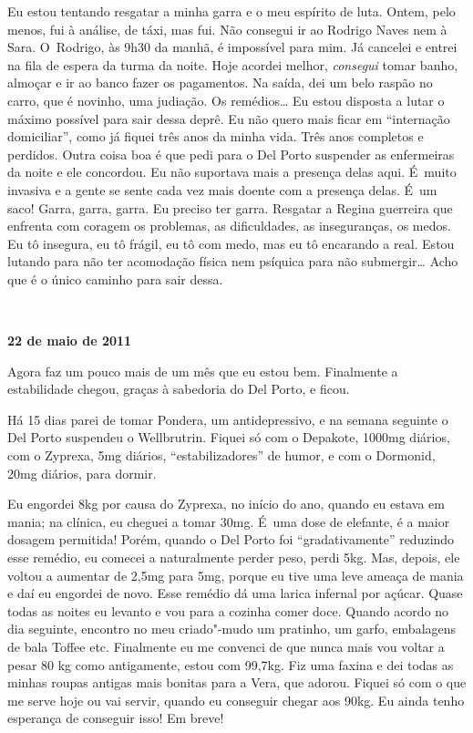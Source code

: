 Eu estou tentando resgatar a minha garra e o meu espírito de luta.
Ontem, pelo menos, fui à análise, de táxi, mas fui. Não consegui ir ao
Rodrigo Naves nem à Sara. O~Rodrigo, às 9h30 da manhã, é impossível para
mim. Já cancelei e entrei na fila de espera da turma da noite. Hoje
acordei melhor, \emph{consegui} tomar banho, almoçar e ir ao banco fazer
os pagamentos. Na saída, dei um belo raspão no carro, que é novinho, uma
judiação. Os remédios… Eu estou disposta a lutar o máximo
possível para sair dessa deprê. Eu não quero mais ficar em ``internação
domiciliar'', como já fiquei três anos da minha vida. Três anos
completos e perdidos. Outra coisa boa é que pedi para o Del Porto
suspender as enfermeiras da noite e ele concordou. Eu não suportava mais
a presença delas aqui. É~muito invasiva e a gente se sente cada vez mais
doente com a presença delas. É~um saco! Garra, garra, garra. Eu preciso
ter garra. Resgatar a Regina guerreira que enfrenta com coragem os
problemas, as dificuldades, as inseguranças, os medos. Eu tô insegura,
eu tô frágil, eu tô com medo, mas eu tô encarando a real. Estou lutando
para não ter acomodação física nem psíquica para não submergir…
Acho que é o único caminho para sair dessa.

\begin{center}\asterisc{}​\end{center}


\begin{flushright}\textbf{22 de maio de 2011}\end{flushright}


Agora faz um pouco mais de um mês que eu estou bem. Finalmente a
estabilidade chegou, graças à sabedoria do Del Porto, e ficou.

Há 15 dias parei de tomar Pondera, um antidepressivo, e na semana
seguinte o Del Porto suspendeu o Wellbrutrin. Fiquei só com o Depakote,
1000mg diários, com o Zyprexa, 5mg diários, ``estabilizadores'' de
humor, e com o Dormonid, 20mg diários, para dormir.

Eu engordei 8kg por causa do Zyprexa, no início do ano, quando eu estava
em mania; na clínica, eu cheguei a tomar 30mg. É~uma dose de elefante, é
a maior dosagem permitida! Porém, quando o Del Porto foi
``gradativamente'' reduzindo esse remédio, eu comecei a naturalmente
perder peso, perdi 5kg. Mas, depois, ele voltou a aumentar de 2,5mg para
5mg, porque eu tive uma leve ameaça de mania e daí eu engordei de novo.
Esse remédio dá uma larica infernal por açúcar. Quase todas as noites eu
levanto e vou para a cozinha comer doce. Quando acordo no dia seguinte,
encontro no meu criado"-mudo um pratinho, um garfo, embalagens de bala
Toffee etc. Finalmente eu me convenci de que nunca mais vou voltar a
pesar 80 kg como antigamente, estou com 99,7kg. Fiz uma faxina e dei
todas as minhas roupas antigas mais bonitas para a Vera, que adorou.
Fiquei só com o que me serve hoje ou vai servir, quando eu conseguir
chegar aos 90kg. Eu ainda tenho esperança de conseguir isso! Em breve!

